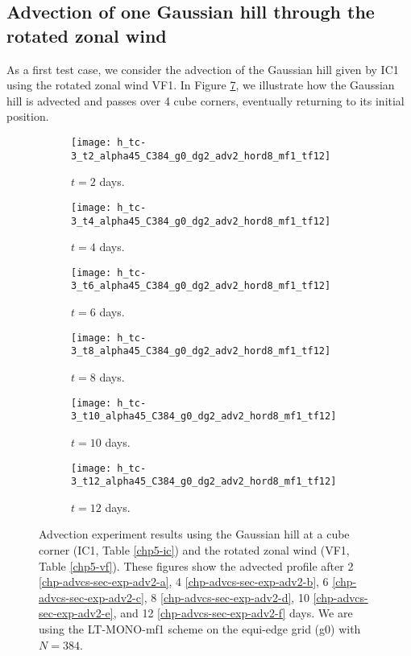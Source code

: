 \newpage
\subsection{Advection of one Gaussian hill through the rotated zonal wind}
As a first test case, we consider the advection of the Gaussian hill given by IC1 using 
the rotated zonal wind VF1.
In Figure \ref{chp-advcs-sec-exp-adv2}, we illustrate how the Gaussian hill is advected and passes over 4 cube corners, 
eventually returning to its initial position. 
\begin{figure}[!htb]
	\centering
	\begin{subfigure}{0.45\textwidth}
		\centering
		\texttt{[image: h\_tc-3\_t2\_alpha45\_C384\_g0\_dg2\_adv2\_hord8\_mf1\_tf12]}
		\caption{$t=2$ days.\label{chp-advcs-sec-exp-adv2-a}}
	\end{subfigure}
	\begin{subfigure}{0.45\textwidth}
		\centering
		\texttt{[image: h\_tc-3\_t4\_alpha45\_C384\_g0\_dg2\_adv2\_hord8\_mf1\_tf12]}
		\caption{$t=4$ days.\label{chp-advcs-sec-exp-adv2-b}}
	\end{subfigure}

	\begin{subfigure}{0.45\textwidth}
		\centering
		\texttt{[image: h\_tc-3\_t6\_alpha45\_C384\_g0\_dg2\_adv2\_hord8\_mf1\_tf12]}
		\caption{$t=6$ days.\label{chp-advcs-sec-exp-adv2-c}}
	\end{subfigure}	
	\begin{subfigure}{0.45\textwidth}
		\centering
		\texttt{[image: h\_tc-3\_t8\_alpha45\_C384\_g0\_dg2\_adv2\_hord8\_mf1\_tf12]}
		\caption{$t=8$ days.\label{chp-advcs-sec-exp-adv2-d}}
	\end{subfigure}

	\begin{subfigure}{0.45\textwidth}
		\centering
		\texttt{[image: h\_tc-3\_t10\_alpha45\_C384\_g0\_dg2\_adv2\_hord8\_mf1\_tf12]}
		\caption{$t=10$ days.\label{chp-advcs-sec-exp-adv2-e}}
	\end{subfigure}
	\begin{subfigure}{0.45\textwidth}
		\centering
		\texttt{[image: h\_tc-3\_t12\_alpha45\_C384\_g0\_dg2\_adv2\_hord8\_mf1\_tf12]}
		\caption{$t=12$ days.\label{chp-advcs-sec-exp-adv2-f}}
	\end{subfigure}
	\caption{Advection experiment results using the Gaussian hill at a cube corner (IC1, Table \ref{chp5-ic}) and 
		the rotated zonal wind (VF1, Table \ref{chp5-vf}).
		These figures show the advected profile after
		2 \eqref{chp-advcs-sec-exp-adv2-a}, 
		4  \eqref{chp-advcs-sec-exp-adv2-b},
		6  \eqref{chp-advcs-sec-exp-adv2-c},
		8  \eqref{chp-advcs-sec-exp-adv2-d},
		10  \eqref{chp-advcs-sec-exp-adv2-e},
		and 12  \eqref{chp-advcs-sec-exp-adv2-f} days.
		We are using the LT-MONO-mf1 scheme on the equi-edge grid (g0) with $N=384$. \label{chp-advcs-sec-exp-adv2}}
\end{figure}

